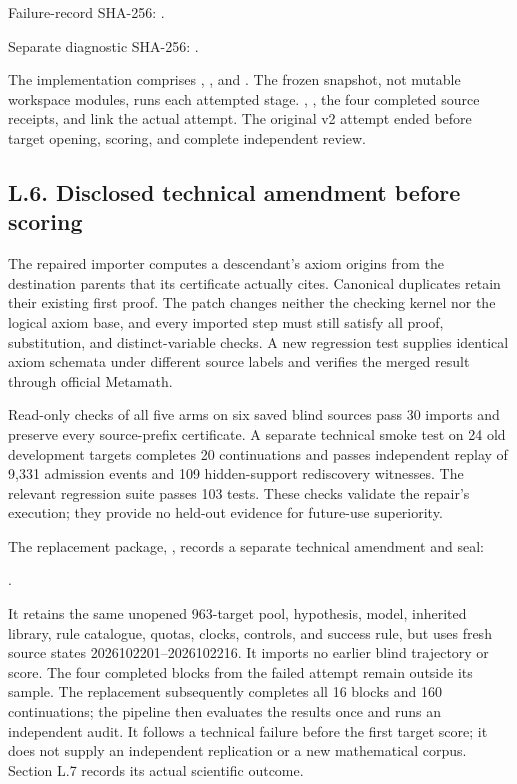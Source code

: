 \documentclass[pdflatex,sn-basic,Numbered]{sn-jnl}
\begin{document}
Failure-record SHA-256: .

Separate diagnostic SHA-256: .

The implementation comprises , , and . The frozen snapshot, not mutable workspace modules, runs each attempted stage. , , the four completed source receipts, and  link the actual attempt. The original v2 attempt ended before target opening, scoring, and complete independent review.

\subsection*{L.6. Disclosed technical amendment before scoring}\label{l.6.-disclosed-technical-amendment-before-scoring}

The repaired importer computes a descendant's axiom origins from the destination parents that its certificate actually cites. Canonical duplicates retain their existing first proof. The patch changes neither the checking kernel nor the logical axiom base, and every imported step must still satisfy all proof, substitution, and distinct-variable checks. A new regression test supplies identical axiom schemata under different source labels and verifies the merged result through official Metamath.

Read-only checks of all five arms on six saved blind sources pass 30 imports and preserve every source-prefix certificate. A separate technical smoke test on 24 old development targets completes 20 continuations and passes independent replay of 9,331 admission events and 109 hidden-support rediscovery witnesses. The relevant regression suite passes 103 tests. These checks validate the repair's execution; they provide no held-out evidence for future-use superiority.

The replacement package, , records a separate technical amendment and seal:

.

It retains the same unopened 963-target pool, hypothesis, model, inherited library, rule catalogue, quotas, clocks, controls, and success rule, but uses fresh source states 2026102201--2026102216. It imports no earlier blind trajectory or score. The four completed blocks from the failed attempt remain outside its sample. The replacement subsequently completes all 16 blocks and 160 continuations; the pipeline then evaluates the results once and runs an independent audit. It follows a technical failure before the first target score; it does not supply an independent replication or a new mathematical corpus. Section L.7 records its actual scientific outcome.
\end{document}
